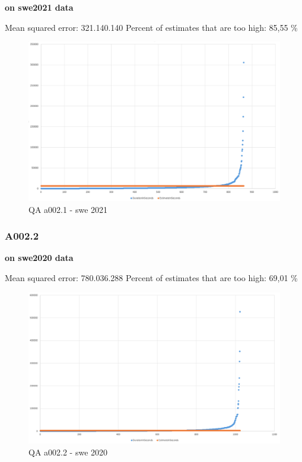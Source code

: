 \textbf{on swe2021 data}

Mean squared error: 321.140.140 Percent of estimates that are too high:
85,55 \%

\begin{figure}
\centering
\includegraphics{Documentation/10000-A002/a002_1-swe2021.png}
\caption{QA a002.1 - swe 2021}
\end{figure}

\hypertarget{a002.2-1}{%
\subsubsection{A002.2}\label{a002.2-1}}

\textbf{on swe2020 data}

Mean squared error: 780.036.288 Percent of estimates that are too high:
69,01 \%

\begin{figure}
\centering
\includegraphics{Documentation/10000-A002/a002_2-swe2020.png}
\caption{QA a002.2 - swe 2020}
\end{figure}


